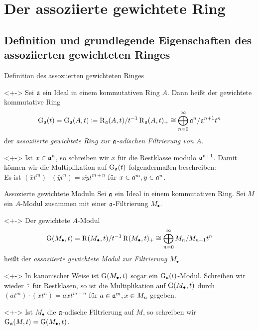 \section{Der assoziierte gewichtete Ring}

\subsection{Definition und grundlegende Eigenschaften des assoziierten gewichteten Ringes}

\begin{frame}{Definition des assoziierten gewichteten Ringes}
	\begin{definition}<+->
		Sei \(\mathfrak{a}\) ein Ideal in einem kommutativen Ring \(A\). Dann heißt der
		gewichtete kommutative Ring
		\[
			\operatorname{G}_{\mathfrak{a}}(t) = \operatorname{G}_{\mathfrak{a}}(A, t)
			\coloneqq \operatorname{R}_{\mathfrak{a}}(A, t)/t^{-1} \operatorname{R}_{\mathfrak{a}}(A, t)_+ 
			\cong \bigoplus\limits_{n = 0}^\infty \mathfrak{a}^n/\mathfrak{a}^{n + 1} t^n
		\]
		der \emph{assoziierte gewichtete Ring zur \(\mathfrak{a}\)-adischen Filtrierung von \(A\)}.
	\end{definition}
	\begin{visibleenv}<+->
		Ist \(x \in \mathfrak{a}^n\), so schreiben wir \(\bar x\) für die Restklasse modulo \(\mathfrak{a}^{n + 1}\). Damit können
		wir die Multiplikation auf \(\operatorname{G}_{\mathfrak{a}}(t)\) folgendermaßen beschreiben:
		\\
		Es ist \((\bar x t^m) \cdot (\bar y t^n) = \overline{xy} t^{m + n}\) für \(x \in \mathfrak{a}^m, y \in \mathfrak{a}^n\).
	\end{visibleenv}
\end{frame}

\begin{frame}{Assozierte gewichtete Moduln}
	Sei \(\mathfrak{a}\) ein Ideal in einem kommutativen Ring. 
	Sei \(M\) ein \(A\)-Modul zusammen mit einer \(\mathfrak{a}\)-Filtrierung \(M_\bullet\). 
	\begin{definition}<+->
		Der gewichtete \(A\)-Modul
		\[
			\operatorname{G}(M_\bullet, t) = \operatorname{R}(M_\bullet, t)/t^{-1} \operatorname{R}(M_\bullet, t)_+
			\cong \bigoplus\limits_{n = 0}^\infty M_n/M_{n + 1} t^n
		\]
		heißt der \emph{assoziierte gewichtete Modul zur Filtrierung \(M_\bullet\)}.
	\end{definition}
	\begin{visibleenv}<+->
		In kanonischer Weise ist \(\operatorname{G}(M_\bullet, t)\) sogar ein \(\operatorname{G}_{\mathfrak{a}}(t)\)-Modul. Schreiben wir
		wieder \(\bar\cdot\) für Restklasen, so ist die Multiplikation auf \(\operatorname{G}(M_\bullet, t)\) durch
		\((\bar a t^m) \cdot (\bar x t^n) = \overline{ax} t^{m + n}\) für \(a \in \mathfrak{a}^m, x \in M_n\) gegeben.
	\end{visibleenv}
	\begin{notation}<+->
		Ist \(M_\bullet\) die \(\mathfrak{a}\)-adische Filtrierung auf \(M\), so schreiben wir
		\(\operatorname{G}_{\mathfrak{a}}(M, t) = \operatorname{G}(M_\bullet, t)\).
	\end{notation}
\end{frame}

